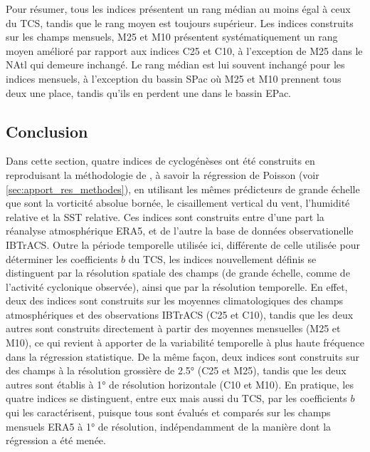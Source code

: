 \documentclass[../main.tex]{subfiles}
\begin{document}
Pour résumer, tous les indices présentent un rang médian au moins égal à ceux du TCS, tandis que le rang moyen est toujours supérieur. Les indices construits
sur les champs mensuels, M25 et M10 présentent systématiquement un rang moyen amélioré par rapport aux indices C25 et C10, à l'exception de M25 dans le NAtl qui
demeure inchangé. Le rang médian est lui souvent inchangé pour les indices mensuels, à l'exception du bassin SPac où M25 et M10 prennent tous deux une place,
tandis qu'ils en perdent une dans le bassin EPac.

\subsection{Conclusion}

Dans cette section, quatre indices de cyclogénèses ont été construits en reproduisant la méthodologie de \textcite{tippett_poisson_2011}, à savoir la régression
de Poisson (voir \cref{sec:apport_res_methodes}), en utilisant les mêmes prédicteurs de grande échelle que sont la vorticité absolue bornée, le cisaillement
vertical du vent, l'humidité relative et la SST relative. Ces indices sont construits entre d'une part la réanalyse atmosphérique ERA5, et de l'autre la base de
données observationelle IBTrACS. Outre la période temporelle utilisée ici, différente de celle utilisée pour déterminer les coefficients $b$ du TCS, les indices
nouvellement définis se distinguent par la résolution spatiale des champs (de grande échelle, comme de l'activité cyclonique observée), ainsi que par la
résolution temporelle. En effet, deux des indices sont construits sur les moyennes climatologiques des champs atmosphériques et des observations IBTrACS (C25 et
C10), tandis que les deux autres sont construits directement à partir des moyennes mensuelles (M25 et M10), ce qui revient à apporter de la variabilité
temporelle à plus haute fréquence dans la régression statistique. De la même façon, deux indices sont construits sur des champs à la résolution grossière de
\ang{2.5} (C25 et M25), tandis que les deux autres sont établis à \ang{1} de résolution horizontale (C10 et M10). En pratique, les quatre indices se
distinguent, entre eux mais aussi du TCS, par les coefficients $b$ qui les caractérisent, puisque tous sont évalués et comparés sur les champs mensuels ERA5 à
\ang{1} de résolution, indépendamment de la manière dont la régression a été menée.
\end{document}
